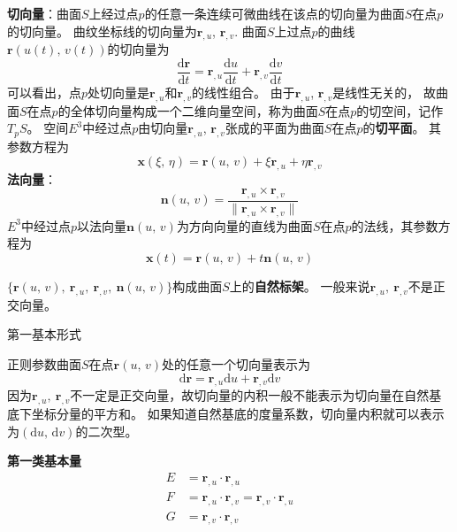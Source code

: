 \textbf{切向量}：曲面$S$上经过点$p$的任意一条连续可微曲线在该点的切向量为曲面$S$在点$p$的切向量。
曲纹坐标线的切向量为$\mathbf{r}_{,u}$, $\mathbf{r}_{,v}$. 
曲面$S$上过点$p$的曲线$\mathbf{r}\left(u(t),\,v(t)\right)$的切向量为
\begin{equation}
    \frac{\mathrm{d}\mathbf{r}}{\mathrm{d}t} = \mathbf{r}_{,u}\frac{\mathrm{d}u}{\mathrm{d}t} + 
    \mathbf{r}_{,v}\frac{\mathrm{d}v}{\mathrm{d}t}
\end{equation}
可以看出，点$p$处切向量是$\mathbf{r}_{,u}$和$\mathbf{r}_{,v}$的线性组合。
由于$\mathbf{r}_{,u}$, $\mathbf{r}_{,v}$是线性无关的，
故曲面$S$在点$p$的全体切向量构成一个二维向量空间，称为曲面$S$在点$p$的切空间，记作$T_{p}S$。
空间$E^{3}$中经过点$p$由切向量$\mathbf{r}_{,u}$, $\mathbf{r}_{,v}$张成的平面为曲面$S$在点$p$的\textbf{切平面}。
其参数方程为
\begin{equation}
    \mathbf{x}\left(\xi,\,\eta\right)=\mathbf{r}\left(u,\, v\right) + \xi\mathbf{r}_{,u} + \eta\mathbf{r}_{,v}
\end{equation}
\textbf{法向量}：
\begin{equation}
    \mathbf{n}\left(u,\,v\right)=\frac{\mathbf{r}_{,u}\times\mathbf{r}_{,v}}{\|\mathbf{r}_{,u}\times\mathbf{r}_{,v}\|}
\end{equation}
$E^{3}$中经过点$p$以法向量$\mathbf{n}\left(u,\,v\right)$为方向向量的直线为曲面$S$在点$p$的法线，其参数方程为
\begin{equation}
    \mathbf{x}\left(t\right)=\mathbf{r}\left(u,\, v\right) + t\mathbf{n}\left(u,\,v\right)
\end{equation}

$\{\mathbf{r}\left(u,\, v\right),\ \mathbf{r}_{,u},\ \mathbf{r}_{,v},\ \mathbf{n}\left(u,\,v\right)\}$构成曲面$S$上的\textbf{自然标架}。
一般来说$\mathbf{r}_{,u},\ \mathbf{r}_{,v}$不是正交向量。

第一基本形式

正则参数曲面$S$在点$\mathbf{r}\left(u,\,v\right)$处的任意一个切向量表示为
\begin{equation}\label{eq:first-diff}
    \mathrm{d}\mathbf{r} = \mathbf{r}_{,u}\mathrm{d}u + \mathbf{r}_{,v}\mathrm{d}v
\end{equation}
因为$\mathbf{r}_{,u},\ \mathbf{r}_{,v}$不一定是正交向量，故切向量的内积一般不能表示为切向量在自然基底下坐标分量的平方和。
如果知道自然基底的度量系数，切向量内积就可以表示为$\left(\mathrm{d}u,\,\mathrm{d}v\right)$的二次型。

\textbf{第一类基本量}
\begin{equation}
    \begin{aligned}
        E &= \mathbf{r}_{,u}\cdot\mathbf{r}_{,u} \\
        F &= \mathbf{r}_{,u}\cdot\mathbf{r}_{,v} = \mathbf{r}_{,v}\cdot\mathbf{r}_{,u} \\
        G &= \mathbf{r}_{,v}\cdot\mathbf{r}_{,v}
    \end{aligned}
\end{equation}

